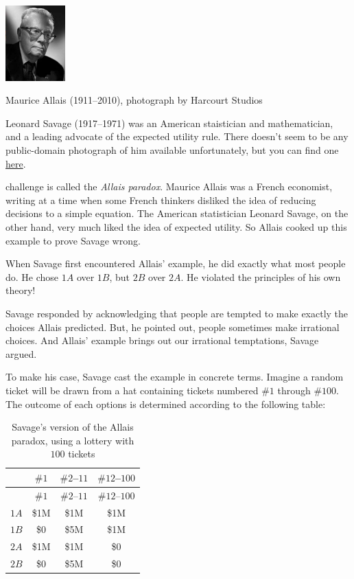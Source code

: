 \documentclass[justified]{tufte-book}
\theoremstyle{definition}
\theoremstyle{definition}
\theoremstyle{definition}
\theoremstyle{remark}
\begin{document}
\begin{marginfigure}
\includegraphics[width=0.91in]{img/allais} \caption[Maurice Allais (1911--2010), photograph by Harcourt Studios]{Maurice Allais (1911--2010), photograph by Harcourt Studios}\label{fig:unnamed-chunk-110}
\end{marginfigure}
\begin{marginfigure}
Leonard Savage (1917--1971) was an American staistician and
mathematician, and a leading advocate of the expected utility rule.
There doesn't seem to be any public-domain photograph of him available
unfortunately, but you can find one
\href{http://policonomics.com/leonard-savage/}{here}.
\end{marginfigure}

 challenge is called the \emph{Allais paradox}. Maurice
Allais was a French economist, writing at a time when some French
thinkers disliked the idea of reducing decisions to a simple equation.
The American statistician Leonard Savage, on the other hand, very much
liked the idea of expected utility. So Allais cooked up this example to
prove Savage wrong.

When Savage first encountered Allais' example, he did exactly what most
people do. He chose \(1A\) over \(1B\), but \(2B\) over \(2A\). He
violated the principles of his own theory!

Savage responded by acknowledging that people are tempted to make
exactly the choices Allais predicted. But, he pointed out, people
sometimes make irrational choices. And Allais' example brings out our
irrational temptations, Savage argued.

To make his case, Savage cast the example in concrete terms. Imagine a
random ticket will be drawn from a hat containing tickets numbered
\(\#1\) through \(\#100\). The outcome of each options is determined
according to the following table:

\begin{longtable}[]{@{}lccc@{}}
\caption{\label{tab:unnamed-chunk-112}Savage's version of the Allais
paradox, using a lottery with \(100\) tickets}\tabularnewline
\toprule
& \(\#1\) & \(\#2\)--\(11\) & \(\#12\)--\(100\)\tabularnewline
\midrule
\endfirsthead
\toprule
& \(\#1\) & \(\#2\)--\(11\) & \(\#12\)--\(100\)\tabularnewline
\midrule
\endhead
\(1A\) & \$1M & \$1M & \$1M\tabularnewline
\(1B\) & \$0 & \$5M & \$1M\tabularnewline
\(2A\) & \$1M & \$1M & \$0\tabularnewline
\(2B\) & \$0 & \$5M & \$0\tabularnewline
\bottomrule
\end{longtable}
\end{document}

